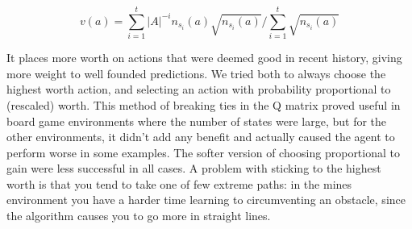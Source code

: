 \begin{equation}
    v(a) = \sum_{i=1}^{t} \vert{A}\vert^{-i} n_{s_i}(a)
    \sqrt{n_{s_i}(a)}\Big/\sum_{i=1}^{t} \sqrt{n_{s_i}(a)}
\end{equation}

It places more worth on actions that were deemed good in recent history, giving
more weight to well founded predictions. We tried both to always choose the
highest worth action, and selecting an action with probability proportional to
(rescaled) worth. This method of breaking ties in the Q matrix proved useful in
board game environments  where the number of states were large, but for the
other environments, it didn't add any benefit and actually caused the agent to
perform worse in some examples. The softer version of choosing proportional to
gain were less successful in all cases. A problem with sticking to the highest
worth is that you tend to take one of few extreme paths: in the mines
environment you have a harder time learning to circumventing an obstacle, since
the algorithm causes you to go more in straight lines.
